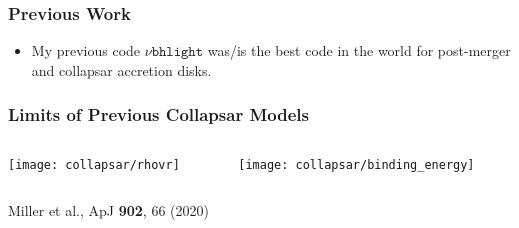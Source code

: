 \documentclass[]{beamer}
\begin{document}
\begin{frame}
  \frametitle{Previous Work}
  \begin{itemize}
  \item My previous code $\nu\texttt{bhlight}$ was/is the best code in
    the world for post-merger and collapsar accretion disks.
  \end{itemize}
  \begin{center}
  \end{center}
\end{frame}

\begin{frame}
  \frametitle{Limits of Previous Collapsar Models}
  \begin{columns}
    \begin{column}{6cm}
      \begin{center}
        \texttt{[image: collapsar/rhovr]}
      \end{center}
    \end{column}
    \begin{column}{6cm}
      \begin{center}
        \texttt{[image: collapsar/binding\_energy]}
      \end{center}
    \end{column}
  \end{columns}
  \begin{tiny}
    Miller et al., ApJ \textbf{902}, 66 (2020)
  \end{tiny}
\end{frame}
\end{document}
